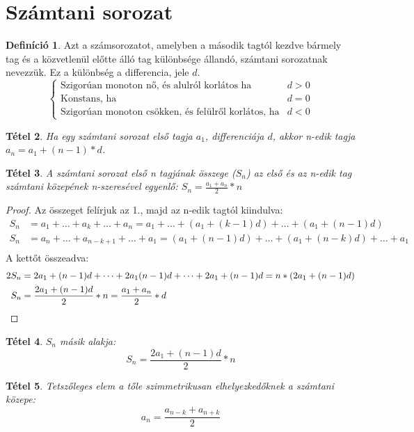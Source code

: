 \documentclass[twoside,12pt]{report}
\newtheorem{theorem}{Tétel}[section]
\theoremstyle{definition}
\newtheorem{definition}[theorem]{Definíció}
\begin{document}
\section{Számtani sorozat}
	\begin{definition}
		Azt a számsorozatot, amelyben a második tagtól kezdve bármely tag és a közvetlenül
		előtte álló tag különbsége állandó, számtani sorozatnak nevezzük. Ez a különbség a differencia, jele $d$.
		\begin{equation*}
		\begin{cases*}
			\text{Szigorúan monoton nő, és alulról korlátos ha} & d>0\\
			\text{Konstans, ha} & d=0\\
			\text{Szigorúan monoton csökken, és felülről korlátos, ha} & d<0
		\end{cases*}
		\end{equation*}
	\end{definition}
	\begin{theorem}
		Ha egy számtani sorozat első tagja $a_1$, differenciája $d$, akkor n-edik tagja $a_n=a_1+(n-1)*d$.
	\end{theorem}
	\begin{theorem}
		A számtani sorozat első n tagjának összege ($S_n$) az első és az n-edik tag számtani közepének n-szeresével egyenlő: $S_n=\frac{a_1+a_n}{2}*n$
	\end{theorem}
	\begin{proof}
		Az összeget felírjuk az 1., majd az n-edik tagtól kiindulva:
		\begin{align*}
			S_n&=a_1+\dots+a_k+\dots+a_n=a_1+\dots+(a_1+(k-1)d)+\dots+(a_1+(n-1)d)\\
			S_n&=a_n+\dots+a_{n-k+1}+\dots+a_1=(a_1+(n-1)d)+\dots+(a_1+(n-k)d)+\dots+a_1\\
		\end{align*}
		A kettőt összeadva:
		\begin{align*}
			2S_n&=2a_1+(n-1)d+\dots+2a_1(n-1)d+\dots+2a_1+(n-1)d=n*(2a_1+(n-1)d)\\
			S_n&=\frac{2a_1+(n-1)d}{2}*n=\frac{a_1+a_n}{2}*d\qedhere
		\end{align*}
	\end{proof}
	\begin{theorem}
		$S_n$ másik alakja:
		\begin{equation*}
			S_n=\frac{2a_1+(n-1)d}{2}*n
		\end{equation*}
	\end{theorem}
	\begin{theorem}
		Tetszőleges elem a tőle szimmetrikusan elhelyezkedőknek a számtani közepe:
		\begin{equation*}
			a_n=\frac{a_{n-k}+a_{n+k}}{2}
		\end{equation*}
	\end{theorem}
\end{document}
